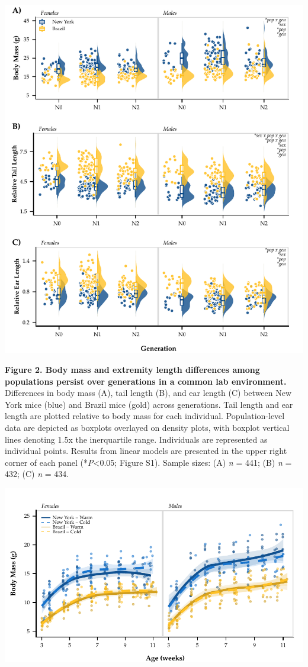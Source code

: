 \documentclass[]{article}
\begin{document}
\includegraphics{../results/figures/Generations_relative.pdf}

\textbf{Figure 2. Body mass and extremity length differences among
populations persist over generations in a common lab environment.}
Differences in body mass (A), tail length (B), and ear length (C)
between New York mice (blue) and Brazil mice (gold) across generations.
Tail length and ear length are plotted relative to body mass for each
individual. Population-level data are depicted as boxplots overlayed on
density plots, with boxplot vertical lines denoting 1.5x the
inerquartile range. Individuals are represented as individual points.
Results from linear models are presented in the upper right corner of
each panel (*\emph{P}\textless{}0.05; Figure S1). Sample sizes: (A)
\emph{n} = 441; (B) \emph{n} = 432; (C) \emph{n} = 434.

\newpage

\includegraphics{../results/figures/Weekly_BW.pdf}
\end{document}

